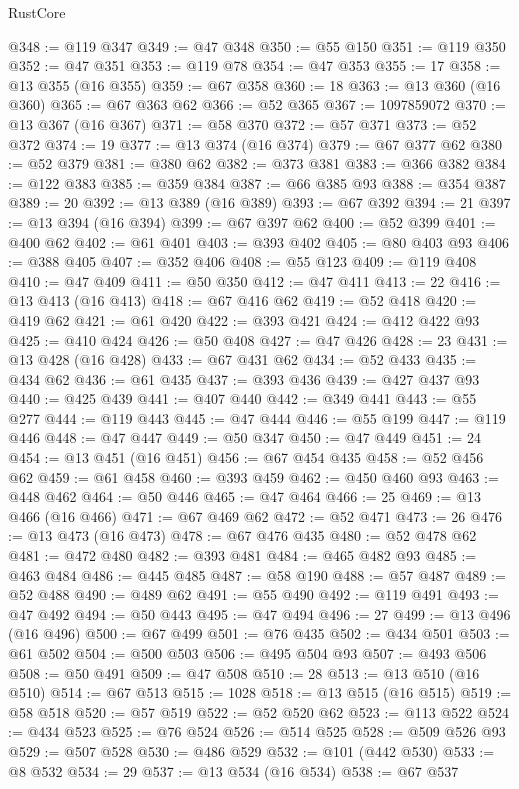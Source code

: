 \begin{lexlean}{RustCore}
\begin{coremodule}
@348 := @119 @347
@349 := @47 @348
@350 := @55 @150
@351 := @119 @350
@352 := @47 @351
@353 := @119 @78
@354 := @47 @353
@355 := 17
@358 := @13 @355 (@16 @355)
@359 := @67 @358
@360 := 18
@363 := @13 @360 (@16 @360)
@365 := @67 @363 @62
@366 := @52 @365
@367 := 1097859072
@370 := @13 @367 (@16 @367)
@371 := @58 @370
@372 := @57 @371
@373 := @52 @372
@374 := 19
@377 := @13 @374 (@16 @374)
@379 := @67 @377 @62
@380 := @52 @379
@381 := @380 @62
@382 := @373 @381
@383 := @366 @382
@384 := @122 @383
@385 := @359 @384
@387 := @66 @385 @93
@388 := @354 @387
@389 := 20
@392 := @13 @389 (@16 @389)
@393 := @67 @392
@394 := 21
@397 := @13 @394 (@16 @394)
@399 := @67 @397 @62
@400 := @52 @399
@401 := @400 @62
@402 := @61 @401
@403 := @393 @402
@405 := @80 @403 @93
@406 := @388 @405
@407 := @352 @406
@408 := @55 @123
@409 := @119 @408
@410 := @47 @409
@411 := @50 @350
@412 := @47 @411
@413 := 22
@416 := @13 @413 (@16 @413)
@418 := @67 @416 @62
@419 := @52 @418
@420 := @419 @62
@421 := @61 @420
@422 := @393 @421
@424 := @412 @422 @93
@425 := @410 @424
@426 := @50 @408
@427 := @47 @426
@428 := 23
@431 := @13 @428 (@16 @428)
@433 := @67 @431 @62
@434 := @52 @433
@435 := @434 @62
@436 := @61 @435
@437 := @393 @436
@439 := @427 @437 @93
@440 := @425 @439
@441 := @407 @440
@442 := @349 @441
@443 := @55 @277
@444 := @119 @443
@445 := @47 @444
@446 := @55 @199
@447 := @119 @446
@448 := @47 @447
@449 := @50 @347
@450 := @47 @449
@451 := 24
@454 := @13 @451 (@16 @451)
@456 := @67 @454 @435
@458 := @52 @456 @62
@459 := @61 @458
@460 := @393 @459
@462 := @450 @460 @93
@463 := @448 @462
@464 := @50 @446
@465 := @47 @464
@466 := 25
@469 := @13 @466 (@16 @466)
@471 := @67 @469 @62
@472 := @52 @471
@473 := 26
@476 := @13 @473 (@16 @473)
@478 := @67 @476 @435
@480 := @52 @478 @62
@481 := @472 @480
@482 := @393 @481
@484 := @465 @482 @93
@485 := @463 @484
@486 := @445 @485
@487 := @58 @190
@488 := @57 @487
@489 := @52 @488
@490 := @489 @62
@491 := @55 @490
@492 := @119 @491
@493 := @47 @492
@494 := @50 @443
@495 := @47 @494
@496 := 27
@499 := @13 @496 (@16 @496)
@500 := @67 @499
@501 := @76 @435
@502 := @434 @501
@503 := @61 @502
@504 := @500 @503
@506 := @495 @504 @93
@507 := @493 @506
@508 := @50 @491
@509 := @47 @508
@510 := 28
@513 := @13 @510 (@16 @510)
@514 := @67 @513
@515 := 1028
@518 := @13 @515 (@16 @515)
@519 := @58 @518
@520 := @57 @519
@522 := @52 @520 @62
@523 := @113 @522
@524 := @434 @523
@525 := @76 @524
@526 := @514 @525
@528 := @509 @526 @93
@529 := @507 @528
@530 := @486 @529
@532 := @101 (@442 @530)
@533 := @8 @532
@534 := 29
@537 := @13 @534 (@16 @534)
@538 := @67 @537

\end{coremodule}
\end{lexlean}
